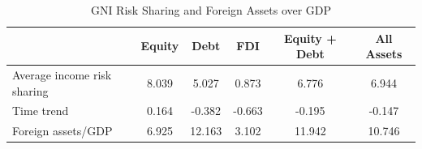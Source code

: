 \begin{table}[!htbp] \centering
\caption{GNI Risk Sharing and Foreign Assets over GDP}
\label{tab:table5_gni_assets}
\begin{tabular}{lccccc}
\hline\hline
 & Equity & Debt & FDI & Equity + Debt & All Assets \\
\hline
Average income risk sharing & 8.039 & 5.027 & 0.873 & 6.776 & 6.944 \\
Time trend & 0.164 & -0.382 & -0.663 & -0.195 & -0.147 \\
Foreign assets/GDP & 6.925 & 12.163 & 3.102 & 11.942 & 10.746 \\
\hline\hline
\end{tabular}
\end{table}
